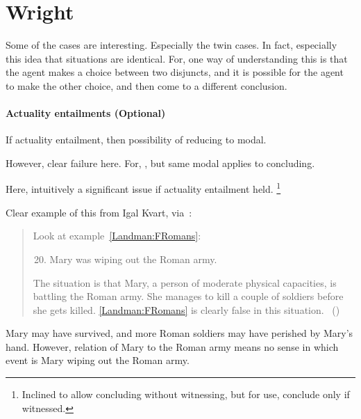 \section{Wright}
\label{sec:wright}

\begin{note}
  \color{red}
  Some of the \citeauthor{Wright:2011wn} cases are interesting.
  Especially the twin cases.
  In fact, especially this idea that situations are identical.
  For, one way of understanding this is that the agent makes a choice between two disjuncts, and it is possible for the agent to make the other choice, and then come to a different conclusion.
\end{note}

\paragraph[Actuality entailments]{Actuality entailments \hfill (Optional)}


\begin{note}
  
  If actuality entailment, then possibility of reducing to modal.

  However, clear failure here.
  For, \support{}, but same modal applies to concluding.

  Here, intuitively a significant issue if actuality entailment held.%
  \footnote{
    Inclined to allow concluding without witnessing, but for use, conclude only if witnessed.
  }
\end{note}


\begin{note}
  Clear example of this from Igal Kvart, via~\textcite{Landman:1992wh}:

  \begin{quote}
    Look at example~\ref{Landman:FRomans}:
    \begin{enumerate}[label=(\arabic*), ref=(\arabic*)]
      \setcounter{enumi}{19}
    \item
      \label{Landman:FRomans}
      Mary was wiping out the Roman army.
    \end{enumerate}

    The situation is that Mary, a person of moderate physical capacities, is battling the Roman army.
    She manages to kill a couple of soldiers before she gets killed.
    \ref{Landman:FRomans} is clearly false in this situation.\newline
    \mbox{ }\hfill\mbox{(\citeyear[18]{Landman:1992wh})}
  \end{quote}

  Mary may have survived, and more Roman soldiers may have perished by Mary's hand.
  However, relation of Mary to the Roman army means no sense in which event is Mary wiping out the Roman army.
\end{note}


